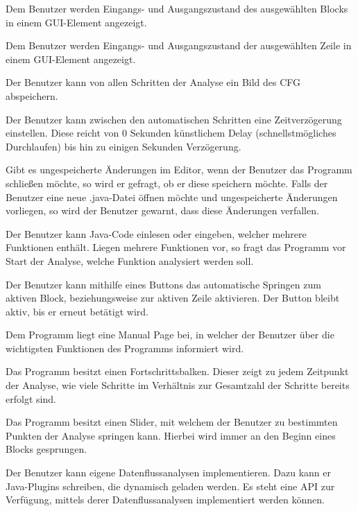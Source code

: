 Dem Benutzer werden Eingangs- und Ausgangszustand des ausgewählten Blocks in einem GUI-Element angezeigt.

Dem Benutzer werden Eingangs- und Ausgangszustand der ausgewählten Zeile in einem GUI-Element angezeigt.

Der Benutzer kann von allen Schritten der Analyse ein Bild des CFG abspeichern.

Der Benutzer kann zwischen den automatischen Schritten eine Zeitverzögerung einstellen. Diese reicht von 0 Sekunden künstlichem Delay (schnellstmögliches Durchlaufen) bis hin zu einigen Sekunden Verzögerung.

Gibt es ungespeicherte Änderungen im Editor, wenn der Benutzer das Programm schließen möchte, so wird er gefragt, ob er diese speichern möchte.
Falls der Benutzer eine neue .java-Datei öffnen möchte und ungespeicherte Änderungen vorliegen, so wird der Benutzer gewarnt, dass diese Änderungen verfallen.

Der Benutzer kann Java-Code einlesen oder eingeben, welcher mehrere Funktionen
enthält. Liegen mehrere Funktionen vor, so fragt das Programm vor Start der Analyse, welche Funktion analysiert werden soll.

Der Benutzer kann mithilfe eines Buttons das automatische Springen zum aktiven Block, beziehungsweise zur aktiven Zeile aktivieren. Der Button bleibt aktiv, bis er erneut betätigt wird.

Dem Programm liegt eine Manual Page bei, in welcher der Benutzer über die wichtigsten Funktionen des Programms informiert wird.

\newpage

Das Programm besitzt einen Fortschrittsbalken. Dieser zeigt zu jedem Zeitpunkt der Analyse, wie viele Schritte im Verhältnis zur Gesamtzahl der Schritte bereits erfolgt sind.

Das Programm besitzt einen Slider, mit welchem der Benutzer zu bestimmten Punkten der Analyse springen kann. Hierbei wird immer an den Beginn eines Blocks gesprungen.

Der Benutzer kann eigene Datenflussanalysen implementieren. Dazu kann er Java-Plugins schreiben, die dynamisch geladen werden. Es steht eine API zur Verfügung, mittels derer Datenflussanalysen implementiert werden können.